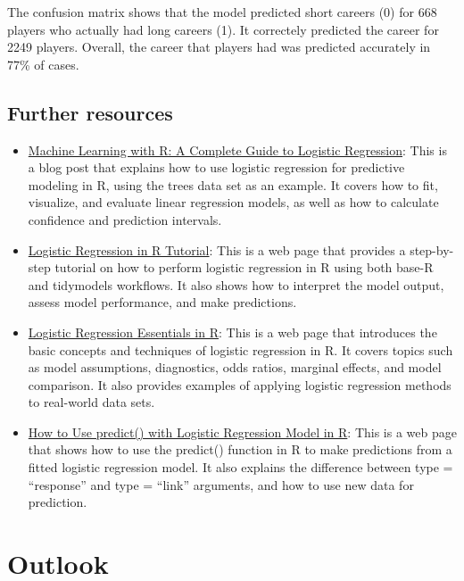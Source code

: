 \documentclass[
]{book}
\providecommand{\tightlist}{%
  \setlength{\itemsep}{0pt}\setlength{\parskip}{0pt}}
\begin{document}
The confusion matrix shows that the model predicted short careers (0) for 668 players who actually had long careers (1). It correctely predicted the career for 2249 players. Overall, the career that players had was predicted accurately in 77\% of cases.

\hypertarget{further-resources-7}{%
\section{Further resources}\label{further-resources-7}}

\begin{itemize}
\tightlist
\item
  \href{https://www.r-bloggers.com/2021/01/machine-learning-with-r-a-complete-guide-to-logistic-regression/}{Machine Learning with R: A Complete Guide to Logistic Regression}: This is a blog post that explains how to use logistic regression for predictive modeling in R, using the trees data set as an example. It covers how to fit, visualize, and evaluate linear regression models, as well as how to calculate confidence and prediction intervals.
\item
  \href{https://www.datacamp.com/tutorial/logistic-regression-R}{Logistic Regression in R Tutorial}: This is a web page that provides a step-by-step tutorial on how to perform logistic regression in R using both base-R and tidymodels workflows. It also shows how to interpret the model output, assess model performance, and make predictions.
\item
  \href{http://sthda.com/english/articles/36-classification-methods-essentials/151-logistic-regression-essentials-in-r/}{Logistic Regression Essentials in R}: This is a web page that introduces the basic concepts and techniques of logistic regression in R. It covers topics such as model assumptions, diagnostics, odds ratios, marginal effects, and model comparison. It also provides examples of applying logistic regression methods to real-world data sets.
\item
  \href{https://www.statology.org/r-logistic-regression-predict/}{How to Use predict() with Logistic Regression Model in R}: This is a web page that shows how to use the predict() function in R to make predictions from a fitted logistic regression model. It also explains the difference between type = ``response'' and type = ``link'' arguments, and how to use new data for prediction.
\end{itemize}

\hypertarget{out-look}{%
\chapter{Outlook}\label{out-look}}
\end{document}
